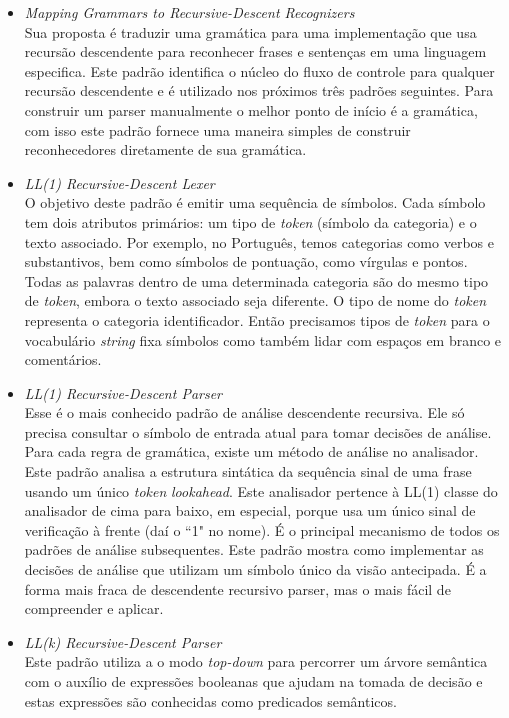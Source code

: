 \begin{itemize}
	\item \emph{Mapping Grammars to Recursive-Descent Recognizers}\\

	Sua proposta é traduzir uma gramática para uma implementação que usa recursão descendente 
para reconhecer frases e sentenças em uma linguagem especifica. Este padrão identifica o núcleo do fluxo de controle 
para qualquer recursão descendente e é utilizado nos próximos três 
padrões seguintes. Para construir um parser
manualmente o melhor ponto de início é a gramática, com isso este padrão fornece uma maneira simples de construir reconhecedores diretamente de sua gramática.
	
	\item \emph{LL(1) Recursive-Descent Lexer}\\

	O objetivo deste padrão é emitir uma sequência de símbolos. Cada símbolo tem dois atributos primários: 
um tipo de \textit{token} (símbolo da categoria) e o texto associado. Por exemplo, 
	no Português, temos categorias como verbos e substantivos, bem como símbolos de pontuação, como vírgulas e pontos. Todas as palavras dentro de uma determinada categoria são do mesmo tipo de \textit{token}, embora o texto associado seja diferente. O tipo de nome do \textit{token} representa o categoria identificador. Então precisamos tipos de \textit{token} para o vocabulário \textit{string} fixa símbolos como também lidar com espaços em branco e comentários.

	\item \emph{LL(1) Recursive-Descent Parser}\\
	Esse é o mais conhecido padrão de análise descendente recursiva. Ele só precisa	consultar o símbolo de entrada atual para tomar decisões de análise. Para cada regra de gramática, existe um método de análise no analisador. Este padrão analisa a estrutura sintática da sequência sinal de uma frase usando um único \textit{token} \textit{lookahead}. Este analisador pertence à LL(1) classe do analisador de cima para baixo, em especial, porque usa um único sinal de verificação à frente (daí 
o ``1" no nome). É o principal mecanismo de todos os padrões de análise subsequentes. Este padrão mostra 
como implementar as decisões de análise que utilizam um símbolo único da visão antecipada. 
É a forma mais fraca de descendente recursivo parser, mas o mais fácil de compreender e aplicar.

	\item \emph{LL(k) Recursive-Descent Parser}\\
	Este padrão utiliza a o modo \textit{top-down} para percorrer um árvore semântica com o auxílio de expressões booleanas que ajudam na tomada de decisão e estas expressões são conhecidas como predicados semânticos.
	
\end{itemize}



